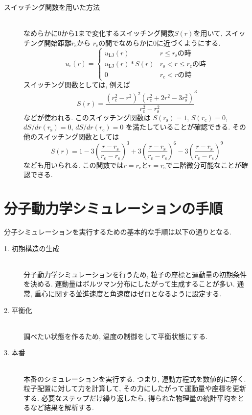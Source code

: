 \begin{description}
\item[スイッチング関数を用いた方法] \mbox{}\\
なめらかに0から1まで変化するスイッチング関数$S(r)$を用いて, スイッチング開始距離$r_{\mathrm{s}}$から
$r_{\mathrm{c}}$の間でなめらかに0に近づくようにする.
 \begin{equation}
  u_{\mathrm{r}} (r) =
  \begin{cases}
   u_{\mathrm{LJ}}(r) & \text{$r \le r_{\mathrm{s}}$の時} \\
   u_{\mathrm{LJ}}(r) * S(r) & \text{$r_{\mathrm{s}} < r \le r_{\mathrm{c}}$の時} \\
   0                  & \text{$r_{\mathrm{c}} < r$の時}
  \end{cases}
 \end{equation}
スイッチング関数としては, 例えば
 \begin{equation}
  S(r) = \frac{(r_{\mathrm{c}}^{2} - r^{2})^{2} (r_{\mathrm{c}}^{2} + 2r^{2} - 3 r_{\mathrm{s}}^{2})}
              {r_{\mathrm{c}}^{2} - r_{\mathrm{s}}^{2}}^{3}
 \end{equation}
などが使われる\cite{1994Steinbach}. このスイッチング関数は
$S(r_{\mathrm{s}}) = 1$,
$S(r_{\mathrm{c}}) = 0$,
$dS/dr(r_{\mathrm{s}}) = 0$,
$dS/dr(r_{\mathrm{c}}) = 0$
を満たしていることが確認できる.
その他のスイッチング関数としては
\begin{equation}
  S(r) = 1
       - 3 \left(\frac{r - r_{\mathrm{s}}}{r_{\mathrm{c}} - r_{\mathrm{s}}} \right)^{3}
       + 3 \left(\frac{r - r_{\mathrm{s}}}{r_{\mathrm{c}} - r_{\mathrm{s}}} \right)^{6}
       - 3 \left(\frac{r - r_{\mathrm{s}}}{r_{\mathrm{c}} - r_{\mathrm{s}}} \right)^{9}
\end{equation}
なども用いられる\cite{2013Sakaguchi}. この関数では$r=r_{\mathrm{c}}$と$r=r_{\mathrm{s}}$で二階微分可能なことが確認できる.
\end{description}


\section{分子動力学シミュレーションの手順}
分子シミュレーションを実行するための基本的な手順は以下の通りとなる.

\begin{description}
 \item[1. 初期構造の生成] \mbox{}\\
 分子動力学シミュレーションを行うため, 粒子の座標と運動量の初期条件を決める.
 運動量はボルツマン分布にしたがって生成することが多い.
 通常, 重心に関する並進速度と角速度はゼロとなるように設定する.

 \item[2. 平衡化] \mbox{}\\
 調べたい状態を作るため, 温度の制御をして平衡状態にする.

 \item[3. 本番] \mbox{}\\
 本番のシミュレーションを実行する. つまり, 運動方程式を数値的に解く.
 粒子配置に対して力を計算して, その力にしたがって運動量や座標を更新する.
 必要なステップだけ繰り返したら, 得られた物理量の統計平均をとるなど結果を解析する.
\end{description}




